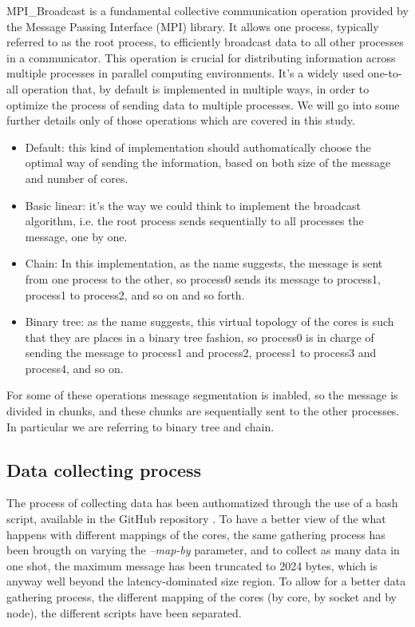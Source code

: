 \documentclass{article}
\begin{document}
	MPI\_Broadcast is a fundamental collective communication operation provided by the Message Passing Interface (MPI) library. It allows one process, typically referred to as the root process, to efficiently broadcast data to all other processes in a communicator. This operation is crucial for distributing information across multiple processes in parallel computing environments. It's a widely used one-to-all operation that, by default is implemented in multiple ways, in order to optimize the process of sending data to multiple processes.
	We will go into some further details only of those operations which are covered in this study.
	\begin{itemize}
		\item Default: this kind of implementation should authomatically choose the optimal way of sending the information, based on both size of the message and number of cores.\\
		\item Basic linear: it's the way we could think to implement the broadcast algorithm, i.e. the root process sends sequentially to all processes the message, one by one.\\
		\item Chain: In this implementation, as the name suggests, the message is sent from one process to the other, so process0 sends its message to process1, process1 to process2, and so on and so forth.\\
		\item Binary tree: as the name suggests, this virtual topology of the cores is such that they are places in a binary tree fashion, so process0 is in charge of sending the message to process1 and process2, process1 to process3 and process4, and so on.
	\end{itemize}
	
	For some of these operations message segmentation is inabled, so the message is divided in chunks, and these chunks are sequentially sent to the other processes. In particular we are referring to binary tree and chain.
	
	\subsection{Data collecting process}
	The process of collecting data has been authomatized through the use of a bash script, available in the GitHub repository \cite{repo}. 
	To have a better view of the what happens with different mappings of the cores, the same gathering process has been brougth on varying the \textit{--map-by} parameter, and to collect as many data in one shot, the maximum message has been truncated to 2024 bytes, which is anyway well beyond the latency-dominated size region.
	To allow for a better data gathering process, the different mapping of the cores (by core, by socket and by node), the different scripts have been separated.
	
\end{document}
